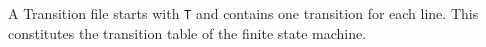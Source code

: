  A Transition file starts with {\tt T} and contains
one transition for each line. This constitutes the transition table
of the finite state machine.